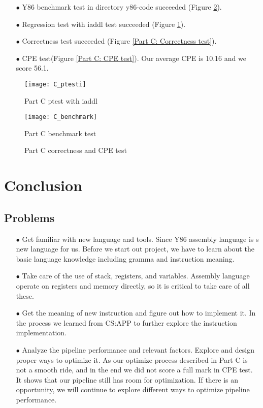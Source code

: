 \documentclass{article}
\begin{document}
\begin{itemize}
\item[$\bullet$]Y86 benchmark test in directory {\ttfamily y86-code} succeeded (Figure \ref{Part C: benchmark test}).
\item[$\bullet$]Regression test with {\ttfamily iaddl} test succeeded (Figure \ref{Part C: ptest with iaddl}).
\item[$\bullet$]Correctness test succeeded (Figure \ref{Part C: Correctness test}). 
\item[$\bullet$]CPE test(Figure \ref{Part C: CPE test}). Our average CPE is 10.16 and we score 56.1.
\end{itemize}
\begin{figure}[htbp]%
		\centering%
		\texttt{[image: C\_ptesti]}
		\caption{Part C ptest with {\ttfamily iaddl}} \label{Part C: ptest with iaddl}%
\end{figure}
\begin{figure}[htbp]%
		\centering%
		\texttt{[image: C\_benchmark]}
		\caption{Part C benchmark test} \label{Part C: benchmark test}%
\end{figure}
\begin{figure}[htbp]
\centering
{}
\quad
{}
\caption{Part C correctness and CPE test}
\end{figure}

\newpage
\section{Conclusion}
\subsection{Problems}
\begin{itemize}
\item[$\bullet$]Get familiar with new language and tools. Since Y86 assembly language is s new language for us. Before we start out project, we have to learn about the basic language knowledge including gramma and instruction meaning.
\item[$\bullet$]Take care of the use of stack, registers, and variables. Assembly language operate on registers and memory directly, so it is critical to take care of all these.
\item[$\bullet$]Get the meaning of new instruction and figure out how to implement it. In the process we learned from CS:APP to further explore the instruction implementation.
\item[$\bullet$]Analyze the pipeline performance and relevant factors. Explore and design proper ways to optimize it. As our optimize process described in Part C is not a smooth ride, and in the end we did not score a full mark in CPE test. It shows that our pipeline still has room for optimization. If there is an opportunity, we will continue to explore different ways to optimize pipeline performance.
\end{itemize}
\end{document}
